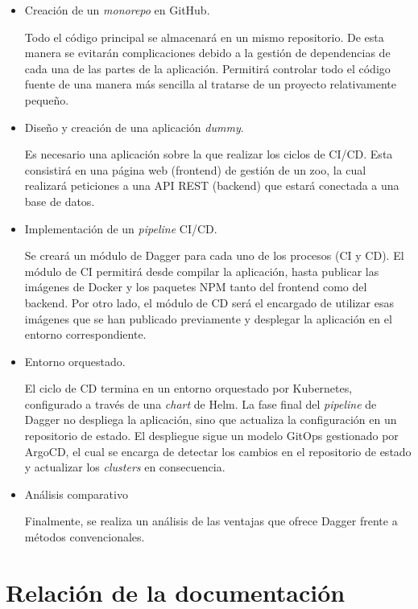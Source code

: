\begin{itemize}
  \item Creación de un \textit{monorepo}\cite{monorepo} en GitHub.

    Todo el código principal se almacenará en un mismo repositorio. De esta manera se evitarán complicaciones debido a la gestión de dependencias de cada una de las partes de la aplicación. Permitirá controlar todo el código fuente de una manera más sencilla al tratarse de un proyecto relativamente pequeño.
  \item Diseño y creación de una aplicación \textit{dummy}.

    Es necesario una aplicación sobre la que realizar los ciclos de CI/CD. Esta consistirá en una página web (frontend) de gestión de un zoo, la cual realizará peticiones a una API REST (backend) que estará conectada a una base de datos.
  \item Implementación de un \textit{pipeline} CI/CD.

    Se creará un módulo de Dagger para cada uno de los procesos (CI y CD). El módulo de CI permitirá desde compilar la aplicación, hasta publicar las imágenes de Docker y los paquetes NPM tanto del frontend como del backend. Por otro lado, el módulo de CD será el encargado de utilizar esas imágenes que se han publicado previamente y desplegar la aplicación en el entorno correspondiente.
  \item Entorno orquestado.

    El ciclo de CD termina en un entorno orquestado por Kubernetes\cite{kubernetes}, configurado a través de una \textit{chart} de Helm\cite{helm}. La fase final del \textit{pipeline} de Dagger no despliega la aplicación, sino que actualiza la configuración en un repositorio de estado. El despliegue sigue un modelo GitOps\cite{gitops} gestionado por ArgoCD\cite{argocd}, el cual se encarga de detectar los cambios en el repositorio de estado y actualizar los \textit{clusters} en consecuencia.

  \item Análisis comparativo

    Finalmente, se realiza un análisis de las ventajas que ofrece Dagger frente a métodos convencionales.
\end{itemize}

\section{Relación de la documentación}

